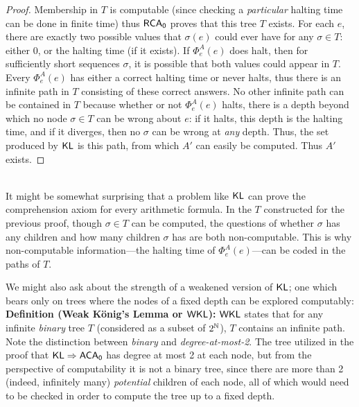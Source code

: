 \documentclass{amsart}
\begin{document}
\begin{proof}
		Membership in $T$ is computable (since checking a \textit{particular} halting time can be done in finite time) thus $\operatorname{\sf{RCA_0}}$ proves that this tree $T$ exists.
		For each $e$, there are exactly two possible values that $\sigma(e)$ could ever have for any $\sigma\in T$: either 0, or the halting time (if it exists). If $\Phi^A_e(e)$ does halt, then for sufficiently short sequences $\sigma$, it is possible that both values could appear in $T$.\\
		\indent Every $\Phi^A_e(e)$ has either a correct halting time or never halts, thus there is an infinite path in $T$ consisting of these correct answers. No other infinite path can be contained in $T$ because whether or not $\Phi^A_e(e)$ halts, there is a depth beyond which no node $\sigma\in T$ can be wrong about $e$: if it halts, this depth is the halting time, and if it diverges, then no $\sigma$ can be wrong at \textit{any} depth. Thus, the set produced by $\operatorname{\sf{KL}}$ is this path, from which $A'$ can easily be computed. Thus $A'$ exists.
	\end{proof}\\
	
	It might be somewhat surprising that a problem like $\operatorname{\sf{KL}}$ can prove the comprehension axiom for every arithmetic formula. In the $T$ constructed for the previous proof, though $\sigma\in T$ can be computed, the questions of whether $\sigma$ has any children and how many children $\sigma$ has are both non-computable. This is why non-computable information---the halting time of $\Phi_e^A(e)$---can be coded in the paths of $T$.
	
	We might also ask about the strength of a weakened version of $\operatorname{\sf{KL}}$; one which bears only on trees where the nodes of a fixed depth can be explored computably:\\
	
	\noindent \textbf{Definition (Weak K\"onig's Lemma or $\sf{WKL}$):} $\sf{WKL}$ states that for any infinite \textit{binary} tree $T$ (considered as a subset of $2^{\mathbb{N}}$), $T$ contains an infinite path.\\
	
	Note the distinction between \textit{binary} and \textit{degree-at-most-2}. The tree utilized in the proof that $\operatorname{\sf{KL}} \Rightarrow \operatorname{\sf{ACA_0}}$ has degree at most 2 at each node, but from the perspective of computability it is not a binary tree, since there are more than 2 (indeed, infinitely many) \textit{potential} children of each node, all of which would need to be checked in order to compute the tree up to a fixed depth.\\
	
\end{document}
